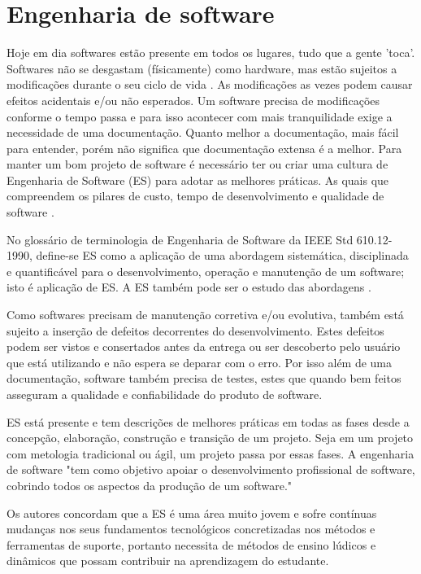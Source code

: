 \section[Engenharia de software]{Engenharia de software}
Hoje em dia softwares estão presente em todos os lugares, tudo que a gente 'toca'. Softwares não se desgastam (físicamente) como hardware, mas estão sujeitos a modificações durante o seu ciclo de vida \cite{Silva_filho}. As modificações as vezes podem causar efeitos acidentais e/ou não esperados. Um software precisa de modificações conforme o tempo passa e para isso acontecer com mais tranquilidade exige a necessidade de uma documentação. Quanto melhor a documentação, mais fácil para entender, porém não significa que documentação extensa é a melhor. Para manter um bom projeto de software é necessário ter ou criar uma cultura de Engenharia de Software (ES) para adotar as melhores práticas. As quais que compreendem os pilares de custo, tempo de desenvolvimento e qualidade de software \cite{Silva_filho}.

No glossário de terminologia de Engenharia de Software da IEEE Std 610.12-1990, define-se ES como a aplicação de uma abordagem sistemática, disciplinada e quantificável para o desenvolvimento, operação e manutenção de um software; isto é aplicação de ES. A ES também pode ser o estudo das abordagens \cite{ieeeTerminology}.

Como softwares precisam de manutenção corretiva e/ou evolutiva, também está sujeito a inserção de defeitos decorrentes do desenvolvimento. Estes defeitos podem ser vistos e consertados antes da entrega \cite{Silva_filho} ou ser descoberto pelo usuário que está utilizando e não espera se deparar com o erro. Por isso além de uma documentação, software também precisa de testes, estes que quando bem feitos asseguram a qualidade e confiabilidade do produto de software.

ES está presente e tem descrições de melhores práticas em todas as fases desde a concepção, elaboração, construção e transição de um projeto. Seja em um projeto com metologia tradicional ou ágil, um projeto passa por essas fases. A engenharia de software "tem como objetivo apoiar o desenvolvimento profissional de software, cobrindo todos os aspectos da produção de um software."

Os autores \cite{sucessoJogoEngSoft} \cite{benittiMolleri} concordam que a ES é uma área muito jovem e sofre contínuas mudanças nos seus fundamentos tecnológicos concretizadas nos métodos e ferramentas de suporte, portanto necessita de métodos de ensino lúdicos e dinâmicos que possam contribuir na aprendizagem do estudante.


